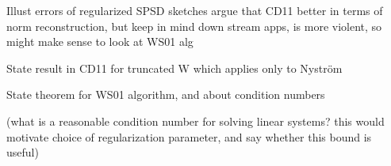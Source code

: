 \documentclass[xcolor={svgnames,pdftex,dvipsnames,table},10pt]{beamer} %
\begin{document}
\begin{frame}
 Illust errors of regularized SPSD sketches 
 argue that CD11 better in terms of norm reconstruction, but keep in mind
 down stream apps, is more violent, so might make sense to look at WS01 alg
\end{frame}

\begin{frame} 
 State result in CD11 for truncated W which applies only to Nystr\"om
\end{frame}

\begin{frame}
 State theorem for WS01 algorithm, and about condition numbers
 
 (what is a reasonable condition number for solving linear systems? this 
 would motivate choice of regularization parameter, and say whether this
 bound is useful)
\end{frame}
\end{document}

